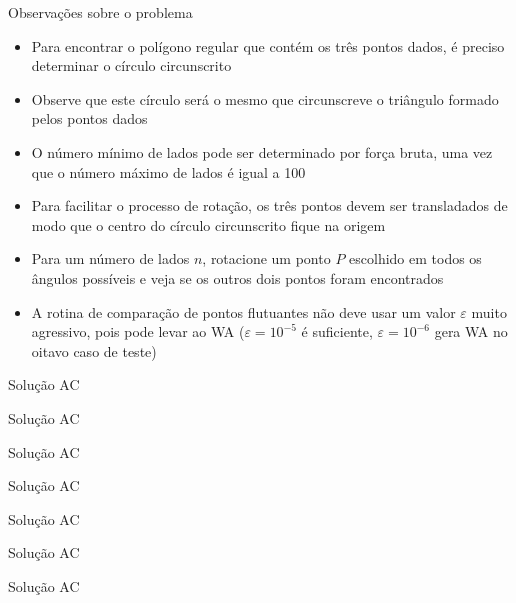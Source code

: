 \begin{frame}[fragile]{Observações sobre o problema}

    \begin{itemize}
        \item Para encontrar o polígono regular que contém os três pontos dados, é preciso
            determinar o círculo circunscrito

        \item Observe que este círculo será o mesmo que circunscreve o triângulo formado pelos
            pontos dados

        \item O número mínimo de lados pode ser determinado por força bruta, uma vez que o
            número máximo de lados é igual a 100

        \item Para facilitar o processo de rotação, os três pontos devem ser transladados de
            modo que o centro do círculo circunscrito fique na origem

        \item Para um número de lados $n$, rotacione um ponto $P$ escolhido em todos os ângulos
            possíveis e veja se os outros dois pontos foram encontrados

        \item A rotina de comparação de pontos flutuantes não deve usar um valor $\varepsilon$ muito
            agressivo, pois pode levar ao WA ($\varepsilon = 10^{-5}$ é suficiente, 
            $\varepsilon = 10^{-6}$ gera WA no oitavo caso de teste)

    \end{itemize}

\end{frame}

\begin{frame}[fragile]{Solução AC}
\end{frame}

\begin{frame}[fragile]{Solução AC}
\end{frame}

\begin{frame}[fragile]{Solução AC}
\end{frame}

\begin{frame}[fragile]{Solução AC}
\end{frame}

\begin{frame}[fragile]{Solução AC}
\end{frame}

\begin{frame}[fragile]{Solução AC}
\end{frame}

\begin{frame}[fragile]{Solução AC}
\end{frame}
